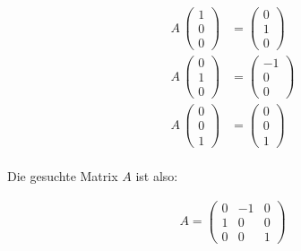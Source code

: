 \begin{align}
A\,
\begin{pmatrix}
1\\
0\\
0
\end{pmatrix}
&=
\begin{pmatrix}
0\\
1\\
0
\end{pmatrix}\\
A\,
\begin{pmatrix}
0\\
1\\
0
\end{pmatrix}
&=
\begin{pmatrix}
-1\\
0\\
0
\end{pmatrix}\\
A\,
\begin{pmatrix}
0\\
0\\
1
\end{pmatrix}
&=
\begin{pmatrix}
0\\
0\\
1
\end{pmatrix}
\end{align}\\
Die gesuchte Matrix $A$ ist also:

\begin{align}
A = 
\begin{pmatrix}
0&-1&0\\
1&0&0\\
0&0&1
\end{pmatrix}
\end{align}